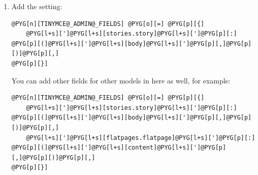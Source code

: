 \documentclass[letterpaper,10pt,english]{manual}
\begin{document}
\begin{enumerate}
\begin{Verbatim}[commandchars=@\[\]]
@PYG[n][TINYMCE@_DEFAULT@_CONFIG] @PYG[o][=] @PYG[p][{]
    @PYG[l+s][']@PYG[l+s][theme]@PYG[l+s][']@PYG[p][:] @PYG[l+s]["]@PYG[l+s][advanced]@PYG[l+s]["]@PYG[p][,]
    @PYG[l+s][']@PYG[l+s][relative@_urls]@PYG[l+s][']@PYG[p][:] @PYG[n+nb+bp][False]@PYG[p][,]
    @PYG[l+s][']@PYG[l+s][plugins]@PYG[l+s][']@PYG[p][:] @PYG[l+s]["]@PYG[l+s][safari,paste,advimage,preview]@PYG[l+s]["]@PYG[p][,]
    @PYG[l+s][']@PYG[l+s][theme@_advanced@_toolbar@_location]@PYG[l+s]['] @PYG[p][:] @PYG[l+s]["]@PYG[l+s][top]@PYG[l+s]["]@PYG[p][,]
    @PYG[l+s][']@PYG[l+s][theme@_advanced@_toolbar@_align]@PYG[l+s]['] @PYG[p][:] @PYG[l+s]["]@PYG[l+s][left]@PYG[l+s]["]@PYG[p][,]
    @PYG[l+s][']@PYG[l+s][theme@_advanced@_buttons1]@PYG[l+s]['] @PYG[p][:] @PYG[l+s]["]@PYG[l+s][formatselect,bold,italic,underline,separator,bullist,numlist,separator,undo,separator,link,unlink,separator,charmap,image,paste,pasteword,separator,code,preview]@PYG[l+s]["]@PYG[p][,]
    @PYG[l+s][']@PYG[l+s][theme@_advanced@_buttons2]@PYG[l+s]['] @PYG[p][:] @PYG[l+s]["]@PYG[l+s]["]@PYG[p][,]
    @PYG[l+s][']@PYG[l+s][theme@_advanced@_buttons3]@PYG[l+s]['] @PYG[p][:] @PYG[l+s]["]@PYG[l+s]["]@PYG[p][,]
    @PYG[c][@#'skin': 'thebigreason',]
        @PYG[l+s][']@PYG[l+s][theme@_advanced@_statusbar@_location]@PYG[l+s]['] @PYG[p][:] @PYG[l+s]["]@PYG[l+s][bottom]@PYG[l+s]["]@PYG[p][,]
        @PYG[l+s][']@PYG[l+s][width]@PYG[l+s][']@PYG[p][:] @PYG[l+s]["]@PYG[l+s][600]@PYG[l+s]["]@PYG[p][,]
        @PYG[l+s][']@PYG[l+s][height]@PYG[l+s][']@PYG[p][:] @PYG[l+s]["]@PYG[l+s][600]@PYG[l+s]["]@PYG[p][,]
@PYG[p][}]
\end{Verbatim}

\item {} 
Add the  setting:

\begin{Verbatim}[commandchars=@\[\]]
@PYG[n][TINYMCE@_ADMIN@_FIELDS] @PYG[o][=] @PYG[p][{]
    @PYG[l+s][']@PYG[l+s][stories.story]@PYG[l+s][']@PYG[p][:] @PYG[p][(]@PYG[l+s][']@PYG[l+s][body]@PYG[l+s][']@PYG[p][,]@PYG[p][)]@PYG[p][,]
@PYG[p][}]
\end{Verbatim}

You can add other fields for other models in here as well, for example:

\begin{Verbatim}[commandchars=@\[\]]
@PYG[n][TINYMCE@_ADMIN@_FIELDS] @PYG[o][=] @PYG[p][{]
    @PYG[l+s][']@PYG[l+s][stories.story]@PYG[l+s][']@PYG[p][:] @PYG[p][(]@PYG[l+s][']@PYG[l+s][body]@PYG[l+s][']@PYG[p][,]@PYG[p][)]@PYG[p][,]
    @PYG[l+s][']@PYG[l+s][flatpages.flatpage]@PYG[l+s][']@PYG[p][:] @PYG[p][(]@PYG[l+s][']@PYG[l+s][content]@PYG[l+s][']@PYG[p][,]@PYG[p][)]@PYG[p][,]
@PYG[p][}]
\end{Verbatim}

\end{enumerate}
\end{document}
